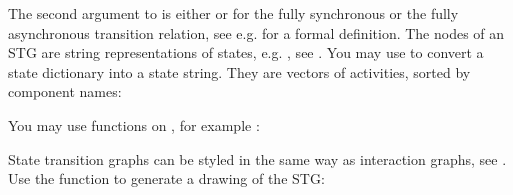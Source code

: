 \documentclass[letterpaper,10pt,english]{sphinxmanual}
\begin{document}
The second argument to {\hyperref[\detokenize{StateTransitionGraphs:primes2stg}]{}} is either  or  for the fully synchronous or the fully asynchronous transition relation, see e.g. {\hyperref[\detokenize{Bibliography:klarner2015approx}]{}} for a formal definition.
The nodes of an STG are string representations of states, e.g. , see {\hyperref[\detokenize{Manual:states-subspaces-paths}]{}}.
You may use {\hyperref[\detokenize{StateTransitionGraphs:state2str}]{}} to convert a state dictionary into a state string.
They are vectors of activities, sorted by component names:

\begin{sphinxVerbatim}[commandchars=\\\{\}]
\PYG{p}{[}\PYG{p}{]}
\end{sphinxVerbatim}

You may use {\hyperref[\detokenize{Installation:installation-networkx}]{}} functions on , for example :

\begin{sphinxVerbatim}[commandchars=\\\{\}]
 
  
\end{sphinxVerbatim}

State transition graphs can be styled in the same way as interaction graphs, see {\hyperref[\detokenize{Manual:drawing-interaction-graphs}]{}}.
Use the function {\hyperref[\detokenize{StateTransitionGraphs:stg2image}]{}} to generate a drawing of the STG:
\end{document}

